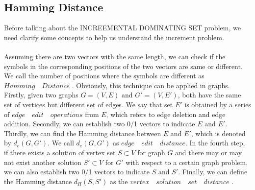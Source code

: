 \subsection{Hamming Distance}
Before talking about the \large{I}\normalsize{NCREEMENTAL} \large{D}\normalsize{OMINATING} \Large{S}\normalsize{ET} problem, we need clarify some concepts to help us understand the increment problem.
\\
\\
Assuming there are two vectors with the same length, we can check if the symbols in the corresponding positions of the two vectors are same or different. We call the number of positions where the symbols are different as $Hamming\quad Distance$ \cite{hamming1950error}. Obviously, this technique can be applied in graphs. Firstly, given two graphs $G=(V,E)$ and $G'=(V,E')$, both have the same set of vertices but different set of edges. We say that set $E'$ is obtained by a series of $edge\quad edit\quad operations$ from $E$, which refers to edge deletion and edge addition. Secondly, we can establish two 0/1 vectors to indicate $E$ and $E'$. Thirdly, we can find the Hamming distance between $E$ and $E'$, which is denoted by $d_e$$(G,G')$. We call $d_e$$(G,G')$ as $edge\quad edit\quad distance$. In the fourth step, if there exists a solution of vertex set $S \subset V$ for graph $G$ and there may or may not exist another solution $S' \subset V$ for $G'$ with respect to a certain graph problem, we can also establish two 0/1 vectors to indicate $S$ and $S'$. Finally, we can define the Hamming distance $d_H$$(S,S')$ as the $vertex\quad solution\quad set\quad distance$ \cite{downey2014}.
